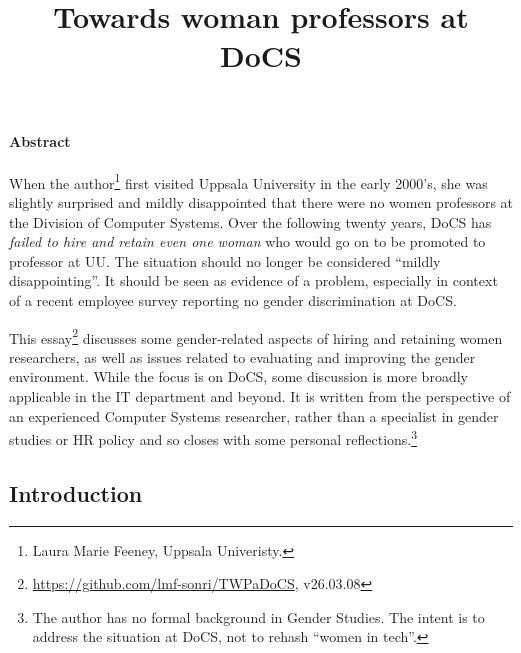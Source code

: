 \documentclass[a4paper,10pt,twocolumn]{article}
\begin{document}
\title{Towards woman professors at DoCS}
\date{}

\maketitle


\paragraph{Abstract} When the author\footnote{Laura Marie Feeney, Uppsala Univeristy.} first
visited Uppsala University in the early 2000's, she was slightly
surprised and mildly disappointed that there were no women professors
at the Division of Computer Systems.
Over the following twenty years, DoCS has \emph{failed to hire and
retain even one woman} who would go on to be promoted to professor at
UU.  The situation should no longer be considered ``mildly
disappointing''.  It should be seen as evidence of a problem,
especially in context of a recent employee survey reporting no gender
discrimination at DoCS.

This essay\footnote{\url{https://github.com/lmf-sonri/TWPaDoCS}, v26.03.08}
discusses some gender-related aspects of hiring and retaining women
researchers, as well as issues related to evaluating and improving the
gender environment.  While the focus is on DoCS, some discussion is
more broadly applicable in the IT department and beyond.  It is
written from the perspective of an experienced Computer Systems
researcher, rather than a specialist in gender studies or HR policy
and so closes with some personal reflections.\footnote{The author has
no formal background in Gender Studies.  The intent is to address the
situation at DoCS, not to rehash ``women in tech''.}


\subsection*{Introduction}
\end{document}
